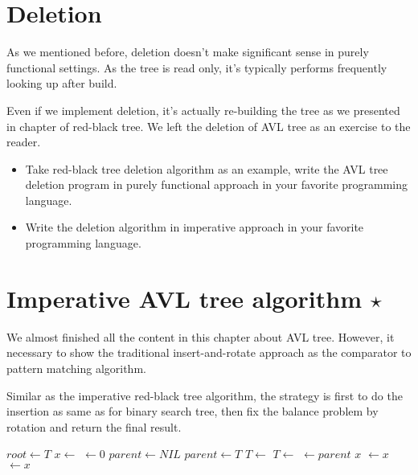 \documentclass{article}
\begin{document}

\section{Deletion}

As we mentioned before, deletion doesn't make significant sense in
purely functional settings. As the tree is read only, it's typically
performs frequently looking up after build.

Even if we implement deletion, it's actually re-building the tree
as we presented in chapter of red-black tree. We left the deletion
of AVL tree as an exercise to the reader.

\begin{Exercise}

\begin{itemize}

\item Take red-black tree deletion algorithm as an example, write the
AVL tree deletion program in purely functional approach in your
favorite programming language.

\item Write the deletion algorithm in imperative approach in your favorite
programming language.

\end{itemize}

\end{Exercise}

\section{Imperative AVL tree algorithm $\star$}

We almost finished all the content in this chapter about AVL tree.
However, it necessary to show the traditional insert-and-rotate
approach as the comparator to pattern matching algorithm.

Similar as the imperative red-black tree algorithm, the strategy
is first to do the insertion as same as for binary search tree,
then fix the balance problem by rotation and return the final result.

\begin{algorithmic}[1]
  \State $root \gets T$
  \State $x \gets$ 
  \State {} $\gets 0$
  \State $parent \gets NIL$
    \State $parent \gets T$
      \State $T \gets $ 
    \Else
      \State $T \gets $ 
    \EndIf
  \EndWhile
  \State {} $\gets parent$
   
    \State \Return $x$
    \State {} $\gets x$
  \Else
    \State {} $\gets x$
  \EndIf
  \State \Return {}
\EndFunction
\end{algorithmic}
\end{document}
